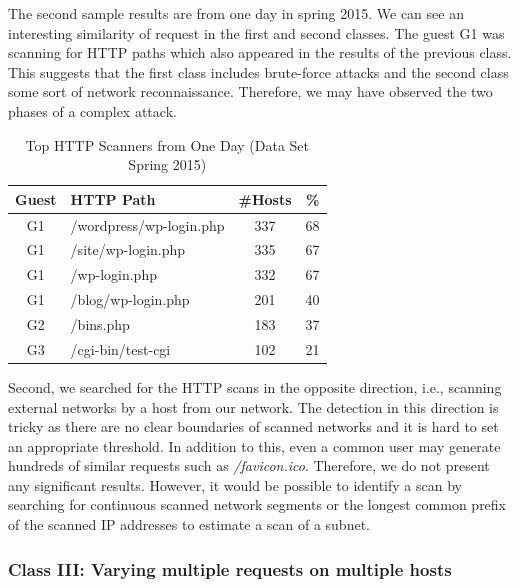 The second sample results are from one day in spring 2015. We can see an interesting similarity of request in the first and second classes. The guest G1 was scanning for HTTP paths which also appeared in the results of the previous class. This suggests that the first class includes brute-force attacks and the second class some sort of network reconnaissance. Therefore, we may have observed the two phases of a complex attack.

\begin{table}[ht]
\centering
\begin{tabular}{| c | l | c | r |} \hline
Guest & HTTP Path & \#Hosts & \% \\ \hline
G1 & /wordpress/wp-login.php & 337 & 68 \\ \hline
G1 & /site/wp-login.php & 335 & 67 \\ \hline
G1 & /wp-login.php & 332 & 67 \\ \hline
G1 & /blog/wp-login.php & 201 & 40 \\ \hline
G2 & /bins.php & 183 & 37 \\ \hline
G3 & /cgi-bin/test-cgi & 102 & 21 \\ \hline
\end{tabular}
\caption{Top HTTP Scanners from One Day (Data Set Spring 2015)}
\label{tab:httpsecurity-scanners2}
\end{table}

Second, we searched for the HTTP scans in the opposite direction, i.e., scanning external networks by a host from our network. The detection in this direction is tricky as there are no clear boundaries of scanned networks and it is hard to set an appropriate threshold. In addition to this, even a common user may generate hundreds of similar requests such as \textit{/favicon.ico}. Therefore, we do not present any significant results. However, it would be possible to identify a scan by searching for continuous scanned network segments or the longest common prefix of the scanned IP addresses to estimate a scan of a subnet.

\subsubsection{Class III: Varying multiple requests on multiple hosts}

